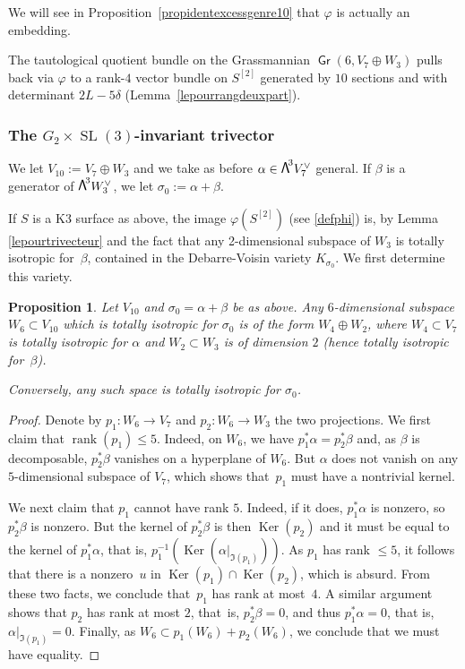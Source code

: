 \documentclass[JEP,XML,SOM,Unicode, NoEqCountersInSection,NoFloatCountersInSection]{cedram}
\newtheorem{prop}[lemm]{Proposition}
\theoremstyle{definition}
\DeclareMathOperator{\Gr}{\mathsf{Gr}}
\let\phi\varphi
\let\dual\vee
\let\Ld L
\DeclareMathOperator{\Ker}{Ker}
\DeclareMathOperator{\rank}{rank}
\DeclareMathOperator{\SL}{SL}
\newcommand\bw[1]{{\hbox{\large$\mathsf{\Lambda}$}^{\!#1}}}
\newcommand\hilbS{S^{[2]}}
\begin{document}
{We will see in Proposition~\ref{propidentexcessgenre10} that $\phi$ is actually an embedding.}

The tautological quotient bundle on the Grassmannian $\Gr(6,V_7\oplus W_3)$ pulls back via $\phi$ to
a rank-$4$ vector bundle
on
$\hilbS$ generated by $10$ sections and with determinant
$2\Ld-5\delta$ (Lemma~\ref{lepourrangdeuxpart}).

\subsubsection{The $G_2\times \SL(3)$-invariant trivector}\label{sec422}
We let $V_{10}:=V_7\oplus W_3$ and we take as before $\alpha\in \bw3V_7^\dual $ general.
If $\beta $ is a generator of
$\bw3W_3^\vee$, we let $\sigma_0:=\alpha+\beta$.

If $S$ is a K3 surface as above, the image $\phi(S^{ [2]})$ (see \eqref{defphi}) is, by Lemma \ref{lepourtrivecteur} and the fact that any 2-dimensional subspace of $W_3$ is totally isotropic for~$\beta$, contained in the Debarre-Voisin variety $K_{\sigma_0}$. We first determine
this variety.

\begin{prop}\label{proisotsubspace}
Let $V_{10} $ and $\sigma_0=\alpha+\beta$ be as above.
Any $6$-dimensional subspace $W_6\subset V_{10} $ which is totally isotropic for $\sigma_0$ is of the form
$W_4\oplus W_2$, where $W_4\subset V_7 $ is totally isotropic for $\alpha$ and
$W_2\subset W_3$ is of dimension $2$ (hence totally isotropic for~$\beta$).

Conversely, any such space is totally isotropic for $\sigma_0$.
\end{prop}

\begin{proof} Denote by $p_1\colon W_6\to V_7 $ and $p_2\colon W_6\to W_3$ the two projections.
We first claim that $\rank (p_1)\le5$. Indeed, on $W_6$, we have
$p_1^*\alpha=p_2^*\beta$ and, as $\beta$ is decomposable, $p_2^*\beta$ vanishes on a hyperplane of $W_6$. But
$\alpha$ does not vanish on any $5$-dimensional subspace of $V_7$, which shows that~$p_1$ must have a nontrivial kernel.

We next claim that $p_1$ cannot have rank $5$. Indeed, if it does, $p_1^*\alpha$ is nonzero, so $p_2^*\beta$ is nonzero. But the kernel of $p_2^*\beta$ is then $\Ker (p_2)$ and it must be equal to the kernel of $p_1^*\alpha$, that is,
$p_1^{-1}(\Ker (\alpha\vert_{\Im (p_1)}))$. As $p_1$ has rank $\leq 5$, it follows that there is a
nonzero~$u$ in $\Ker (p_1)\cap \Ker (p_2)$, which is absurd. From these two facts, we conclude that~$p_1$ has rank at most~$4$. A similar argument shows that $p_2$ has rank
at most $2$, that~is, $p_2^*\beta=0$, and thus $p_1^*\alpha=0$, that is, $\alpha\vert_{\Im (p_1)}=0$. Finally, as $W_6\subset p_1(W_6)+p_2(W_6)$, we conclude that we must have equality.
\end{proof}
\end{document}
